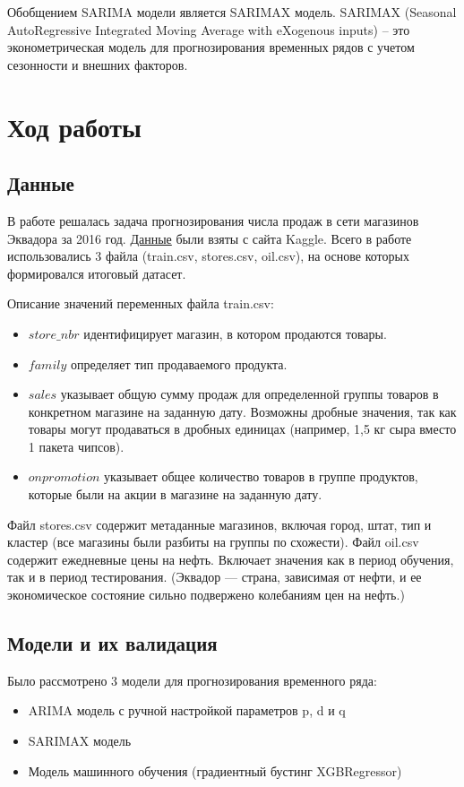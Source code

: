 \documentclass[]{article}
\begin{document}
Обобщением SARIMA модели является SARIMAX модель.
SARIMAX (Seasonal AutoRegressive Integrated Moving Average with eXogenous inputs) – это эконометрическая модель для прогнозирования временных рядов с учетом сезонности и внешних факторов.


\section{Ход работы}
\subsection{Данные}

В работе решалась задача прогнозирования числа продаж в сети магазинов Эквадора за 2016 год. \href{https://www.kaggle.com/c/store-sales-time-series-forecasting/data}{Данные} были взяты с сайта Kaggle. Всего в работе использовались 3 файла (train.csv, stores.csv, oil.csv), на основе которых формировался итоговый датасет.

Описание значений переменных файла train.csv:
\begin{itemize}
	\item  $store\_nbr$ идентифицирует магазин, в котором продаются товары.  
	\item  $family$ определяет тип продаваемого продукта.  
	\item  $sales$ указывает общую сумму продаж для определенной группы товаров в конкретном магазине на заданную дату. Возможны дробные значения, так как товары могут продаваться в дробных единицах (например, 1,5 кг сыра вместо 1 пакета чипсов).  
	\item  $onpromotion$ указывает общее количество товаров в группе продуктов, которые были на акции в магазине на заданную дату.
\end{itemize}

Файл stores.csv содержит метаданные магазинов, включая город, штат, тип и кластер (все магазины были разбиты на группы по схожести). Файл oil.csv содержит ежедневные цены на нефть. Включает значения как в период обучения, так и в период тестирования. (Эквадор — страна, зависимая от нефти, и ее экономическое состояние сильно подвержено колебаниям цен на нефть.)

\subsection{Модели и их валидация}

Было рассмотрено 3 модели для прогнозирования временного ряда:
\begin{itemize}
	\item ARIMA модель с ручной настройкой параметров p, d и q
	\item SARIMAX модель
	\item Модель машинного обучения (градиентный бустинг XGBRegressor)
\end{itemize}
\end{document}
